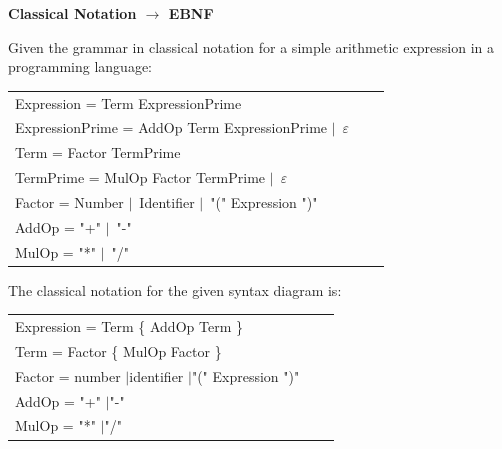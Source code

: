 \documentclass{exam}
\theoremstyle{definition}
\theoremstyle{definition}
\newenvironment{grammar}
	{\begin{tabular}[b]{lcl}}
	{\end{tabular}}
\newcommand{\alternative}{$\mid$}
\begin{document}
\begin{center} 
\end{center}

\begin{questions}

	\question
	{\bf Classical Notation $\to$ EBNF}

	Given the grammar in classical notation for a simple arithmetic expression in a programming language:

	\begin{grammar}
		Expression = Term ExpressionPrime \\
		ExpressionPrime = AddOp Term ExpressionPrime \alternative\ $\varepsilon$ \\
		Term = Factor TermPrime \\
		TermPrime = MulOp Factor TermPrime \alternative\ $\varepsilon$ \\
		Factor = Number \alternative\ Identifier \alternative\ "(" Expression ")"\\
		AddOp = "+" \alternative\ "-"\\
		MulOp = "*" \alternative\ "/"
	\end{grammar}
	

	\begin{solution}
	The classical notation for the given syntax diagram is:

	\begin{grammar}
	Expression = Term \{ AddOp Term \} \\
	Term = Factor \{ MulOp Factor \} \\
	Factor = number \alternative identifier \alternative "(" Expression ")"\\
	AddOp = "+" \alternative "-"\\
	MulOp = "*" \alternative "/"
	\end{grammar}
	\end{solution}
	

\end{questions}
\end{document}
